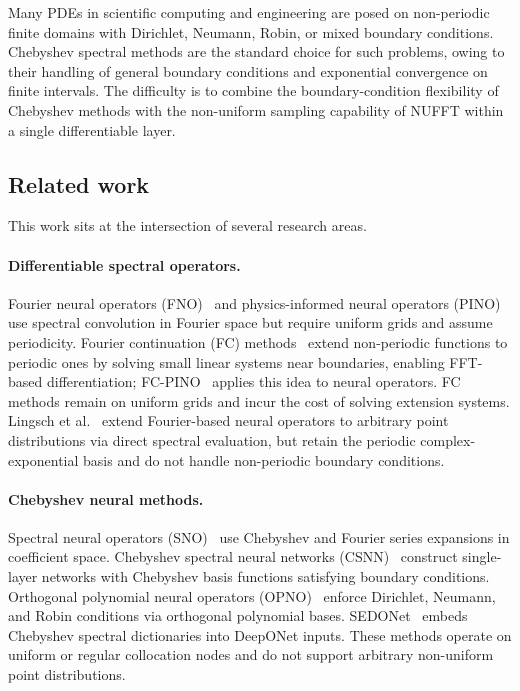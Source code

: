 \documentclass[sn-mathphys,Numbered]{sn-jnl}
\theoremstyle{thmstyleone}
\theoremstyle{thmstyletwo}
\theoremstyle{thmstylethree}
\begin{document}
Many PDEs in scientific computing and engineering are posed on non-periodic finite domains with Dirichlet, Neumann, Robin, or mixed boundary conditions. Chebyshev spectral methods are the standard choice for such problems, owing to their handling of general boundary conditions and exponential convergence on finite intervals. The difficulty is to combine the boundary-condition flexibility of Chebyshev methods with the non-uniform sampling capability of NUFFT within a single differentiable layer.

\subsection{Related work}
This work sits at the intersection of several research areas.

\paragraph{Differentiable spectral operators.}
Fourier neural operators (FNO)~\cite{li2021fourier} and physics-informed neural operators (PINO)~\cite{li2024pino} use spectral convolution in Fourier space but require uniform grids and assume periodicity. Fourier continuation (FC) methods~\cite{maust2022fc,bruno2020fc} extend non-periodic functions to periodic ones by solving small linear systems near boundaries, enabling FFT-based differentiation; FC-PINO~\cite{maust2022fc} applies this idea to neural operators. FC methods remain on uniform grids and incur the cost of solving extension systems. Lingsch et al.~\cite{lingsch2024beyond} extend Fourier-based neural operators to arbitrary point distributions via direct spectral evaluation, but retain the periodic complex-exponential basis and do not handle non-periodic boundary conditions.

\paragraph{Chebyshev neural methods.}
Spectral neural operators (SNO)~\cite{fanaskov2022sno} use Chebyshev and Fourier series expansions in coefficient space. Chebyshev spectral neural networks (CSNN)~\cite{yin2024csnn} construct single-layer networks with Chebyshev basis functions satisfying boundary conditions. Orthogonal polynomial neural operators (OPNO)~\cite{liu2022opno} enforce Dirichlet, Neumann, and Robin conditions via orthogonal polynomial bases. SEDONet~\cite{abid2025sedonet} embeds Chebyshev spectral dictionaries into DeepONet inputs. These methods operate on uniform or regular collocation nodes and do not support arbitrary non-uniform point distributions.
\end{document}
